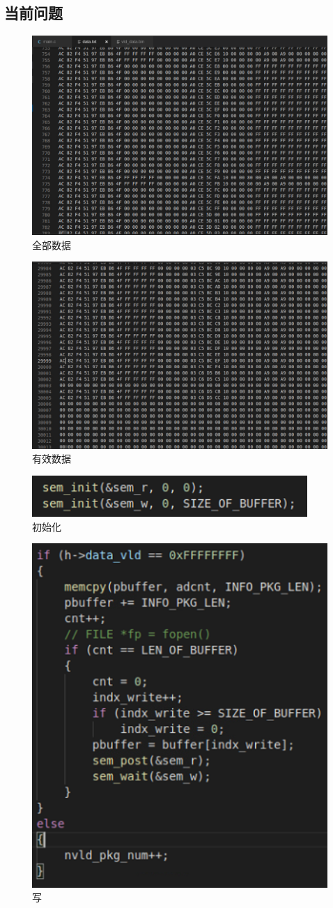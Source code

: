 \documentclass{article}
\begin{document}
\subsection{当前问题}
\begin{figure}[H]
	\centering
	\includegraphics[width = .8\textwidth]{all.png}
	\caption{全部数据}
\end{figure}
\begin{figure}[H]
	\centering
	\includegraphics[width = .8\textwidth]{vld.png}
	\caption{有效数据}
\end{figure}
\begin{figure}[H]
	\centering
	\includegraphics[width = .4\textwidth]{init.png}
	\caption{初始化}
\end{figure}
\begin{figure}[H]
	\centering
	\includegraphics[width = .4\textwidth]{write.png}
	\caption{写}
\end{figure}
\end{document}
